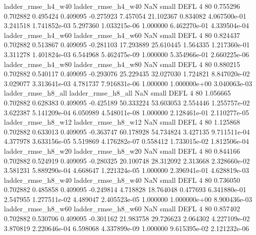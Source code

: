       ladder_rmse_h4_w40       ladder_rmse_h4_w40                   NaN      small     DEFL                 4 80 0.755296       0.702882 0.495424       0.409095   -0.275923      7.457054     21.102367     0.834082   4.067500e-01  3.241518 1.741852e-03     5.297360   1.033215e-06            1.000000    6.462270e-01        4.339504e-04
      ladder_rmse_h4_w60       ladder_rmse_h4_w60                   NaN      small     DEFL                 4 80 0.824437       0.702882 0.513867       0.409095   -0.281103     17.293889     25.610445     1.564335   1.217360e-01  3.311278 1.401824e-03     6.544968   5.462475e-09            1.000000    5.354966e-01        2.660225e-06
      ladder_rmse_h4_w80       ladder_rmse_h4_w80                   NaN      small     DEFL                 4 80 0.880215       0.702882 0.540117       0.409095   -0.293076     25.229435     32.027030     1.724821   8.847020e-02  3.029077 3.313641e-03     4.781737   7.916831e-06            1.000000    1.000000e+00        3.040063e-03
      ladder_rmse_h8_all       ladder_rmse_h8_all                   NaN      small     DEFL                 4 80 1.056665       0.702882 0.628383       0.409095   -0.425189     50.333224     53.603053     2.554446   1.255757e-02  3.622387 5.141209e-04     6.050989   4.548011e-08            1.000000    2.128461e-01        2.110277e-05
      ladder_rmse_h8_w12       ladder_rmse_h8_w12                   NaN      small     DEFL                 4 80 1.125868       0.702882 0.633013       0.409095   -0.363747     60.178928     54.734824     3.427135   9.711511e-04  4.377978 3.633156e-05     5.519869   4.176282e-07            0.558412    1.733015e-02        1.812506e-04
      ladder_rmse_h8_w20       ladder_rmse_h8_w20                   NaN      small     DEFL                 4 80 0.844166       0.702882 0.524919       0.409095   -0.280325     20.100748     28.312092     2.313668   2.328660e-02  3.581231 5.889290e-04     4.668647   1.221324e-05            1.000000    2.396941e-01        4.628819e-03
      ladder_rmse_h8_w40       ladder_rmse_h8_w40                   NaN      small     DEFL                 4 80 0.736050       0.702882 0.485858       0.409095   -0.249814      4.718828     18.764048     0.477693   6.341880e-01  2.547955 1.277511e-02     4.489047   2.405523e-05            1.000000    1.000000e+00        8.900436e-03
      ladder_rmse_h8_w60       ladder_rmse_h8_w60                   NaN      small     DEFL                 4 80 0.857402       0.702882 0.530706       0.409095   -0.301162     21.983758     29.726623     2.064302   4.227109e-02  3.870819 2.220646e-04     6.598068   4.337899e-09            1.000000    9.615395e-02        2.121232e-06
